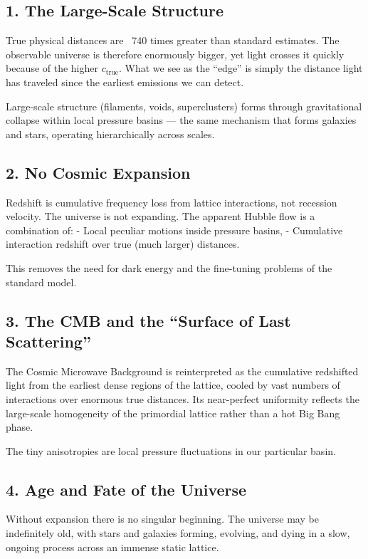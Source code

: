 \documentclass[11pt,a4paper]{book}
\begin{document}
{\subsection{1. The Large-Scale Structure}
True physical distances are ~740 times greater than standard estimates. The observable universe is therefore enormously bigger, yet light crosses it quickly because of the higher \( c_{\text{true}} \). What we see as the “edge” is simply the distance light has traveled since the earliest emissions we can detect.

Large-scale structure (filaments, voids, superclusters) forms through gravitational collapse within local pressure basins — the same mechanism that forms galaxies and stars, operating hierarchically across scales.

\subsection{2. No Cosmic Expansion}
Redshift is cumulative frequency loss from lattice interactions, not recession velocity. The universe is not expanding. The apparent Hubble flow is a combination of:
- Local peculiar motions inside pressure basins,
- Cumulative interaction redshift over true (much larger) distances.

This removes the need for dark energy and the fine-tuning problems of the standard model.

\subsection{3. The CMB and the “Surface of Last Scattering”}
The Cosmic Microwave Background is reinterpreted as the cumulative redshifted light from the earliest dense regions of the lattice, cooled by vast numbers of interactions over enormous true distances. Its near-perfect uniformity reflects the large-scale homogeneity of the primordial lattice rather than a hot Big Bang phase.

The tiny anisotropies are local pressure fluctuations in our particular basin.

\subsection{4. Age and Fate of the Universe}
Without expansion there is no singular beginning. The universe may be indefinitely old, with stars and galaxies forming, evolving, and dying in a slow, ongoing process across an immense static lattice.

}
\end{document}
